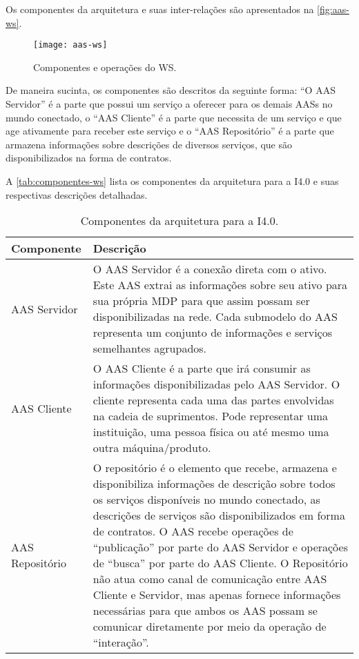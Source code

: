 	Os componentes da arquitetura e suas inter-relações são apresentados na \autoref{fig:aas-ws}.
	
	\begin{figure}[htb]
		\centering
		\label{fig:aas-ws}
		\texttt{[image: aas-ws]}
		\caption{Componentes e operações do WS.}
	\end{figure}

	De maneira sucinta, os componentes são descritos da seguinte forma: ``O AAS Servidor'' é a parte que possui um serviço a oferecer para os demais AASs no mundo conectado, o ``AAS Cliente'' é a parte que necessita de um serviço e que age ativamente para receber este serviço e o ``AAS Repositório'' é a parte que armazena informações sobre descrições de diversos serviços, que são disponibilizados na forma de contratos.
	
	A \autoref{tab:componentes-ws} lista os componentes da arquitetura para a I4.0 e suas respectivas descrições detalhadas.
	
	\begin{table}[htb]
		\centering
		\label{tab:componentes-ws}
		\begin{tabular}{p{3cm}p{12cm}}
			\hline
			\textbf{Componente}
			& \textbf{Descrição} \\ 
			
			\hline
			AAS Servidor
			& O AAS Servidor é a conexão direta com o ativo. Este AAS extrai as informações sobre seu ativo para sua própria MDP para que assim possam ser disponibilizadas na rede. Cada submodelo do AAS representa um conjunto de informações e serviços semelhantes agrupados. \\
			
			\hline
			AAS Cliente
			& O AAS Cliente é a parte que irá consumir as informações disponibilizadas pelo AAS Servidor. O cliente representa cada uma das partes envolvidas na cadeia de suprimentos. Pode representar uma instituição, uma pessoa física ou até mesmo uma outra máquina/produto. \\
			
			\hline
			AAS Repositório
			& O repositório é o elemento que recebe, armazena e disponibiliza informações de descrição sobre todos os serviços disponíveis no mundo conectado, as descrições de serviços são disponibilizados em forma de contratos. O AAS recebe operações de ``publicação'' por parte do AAS Servidor e operações de ``busca'' por parte do AAS Cliente. O Repositório não atua como canal de comunicação entre AAS Cliente e Servidor, mas apenas fornece informações necessárias para que ambos os AAS possam se comunicar diretamente por meio da operação de ``interação''. \\
			
			\hline
		\end{tabular}
		\caption{Componentes da arquitetura para a I4.0.}
	\end{table}
	
